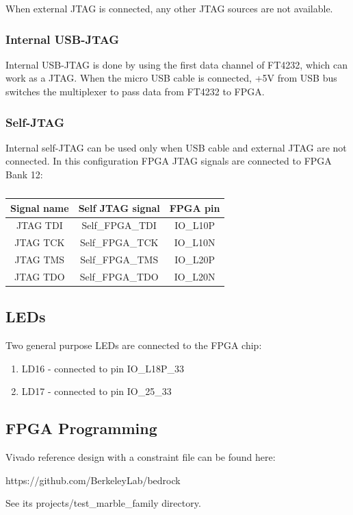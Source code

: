 \documentclass[12pt,oneside,a4]{article}
\begin{document}
When external JTAG is connected, any other JTAG sources are not available.

\subsubsection{Internal USB-JTAG}
Internal USB-JTAG is done by using the first data channel of FT4232, which can work as a JTAG. When the micro USB cable is connected, +5V
from USB bus switches the multiplexer to pass data from FT4232 to FPGA.

\subsubsection{Self-JTAG}
Internal self-JTAG can be used only when USB cable and external JTAG are not connected. In this configuration FPGA JTAG signals are connected to FPGA Bank 12:

\begin{table}[htbp]
\centering
\begin{tabular}{@{}ccc@{}}
\toprule
Signal name& Self JTAG signal & FPGA pin \\ \midrule
JTAG TDI & Self\_FPGA\_TDI & IO\_L10P \\
JTAG TCK & Self\_FPGA\_TCK & IO\_L10N \\
JTAG TMS & Self\_FPGA\_TMS & IO\_L20P \\
JTAG TDO & Self\_FPGA\_TDO & IO\_L20N \\ \bottomrule
\end{tabular}
\caption{}
\label{tab:selfjtag}
\end{table}

\subsection{LEDs}
Two general purpose LEDs are connected to the FPGA chip:
\begin{enumerate}
	\item LD16 - connected to pin IO\_L18P\_33
	\item LD17 - connected to pin IO\_25\_33
\end{enumerate}

\subsection{FPGA Programming}
Vivado reference design with a constraint file can be found here:
\begin{leftbar}
https://github.com/BerkeleyLab/bedrock
\end{leftbar}
See its projects/test\_marble\_family directory.
\end{document}
